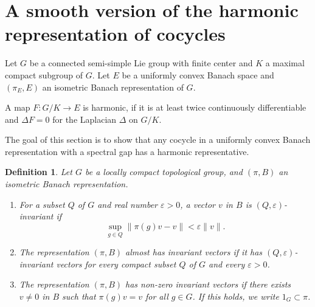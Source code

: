 \documentclass[12pt]{amsart}
\newtheorem{corollary}[theorem]{Corollary}
\newtheorem{definition}[theorem]{Definition}
\theoremstyle{definition}
\providecommand{\tightlist}{%
  \setlength{\itemsep}{0pt}\setlength{\parskip}{0pt}}
\begin{document}



\section{A smooth version of the harmonic representation of cocycles}
\label{sec:a_smooth_version_of_the_harmonic_representation_of_cocycles}

Let \(G\) be a connected semi-simple Lie group with finite center and
\(K\) a maximal compact subgroup of \(G\). Let \(E\) be a uniformly
convex Banach space and \((\pi_{E},E)\) an isometric Banach
representation of \(G\).

A map \(F: G/K \to E\) is harmonic, if it is at least twice continuously
differentiable and \(\Delta F = 0\) for the Laplacian \(\Delta\) on
\(G/K\).

The goal of this section is to show that any cocycle in a uniformly
convex Banach representation with a spectral gap has a harmonic
representative.


\begin{definition}
Let \(G\) be a locally compact topological group, and \((\pi, B)\) an
isometric Banach representation.

\begin{enumerate}
\def\labelenumi{\arabic{enumi}.}
\tightlist
\item
  For a subset \(Q\) of \(G\) and real number \(\varepsilon>0\), a
  vector \(v\) in \(B\) is \emph{\((Q, \varepsilon)\)-invariant} if
  \[\sup _{g \in Q}\|\pi(g) v-v\|<\varepsilon\|v\|.\]
\item
  The representation \((\pi, B)\) \emph{almost has invariant vectors} if
  it has \((Q, \varepsilon)\)-invariant vectors for every compact subset
  \(Q\) of \(G\) and every \(\varepsilon>0\).
\item
  The representation \((\pi, B)\) \emph{has non-zero invariant vectors}
  if there exists \(v \neq 0\) in \(B\) such that \(\pi(g) v=v\) for all
  \(g \in G\). If this holds, we write \(1_G \subset \pi\).
\end{enumerate}
\end{definition}
\end{document}
